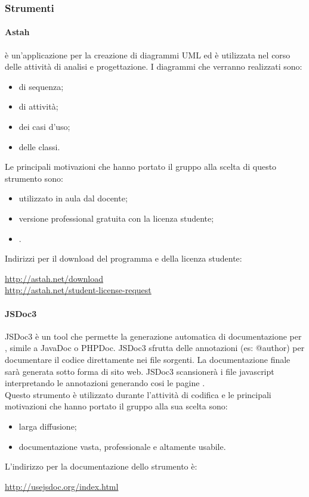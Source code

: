 				\subsubsection{Strumenti}
				\paragraph{Astah} \label{sec:astah}
				 è un'applicazione per la creazione di diagrammi UML ed è utilizzata nel corso delle attività di analisi e progettazione. I diagrammi che verranno realizzati sono:
				\begin{itemize}
					\item di sequenza;
					\item di attività;
					\item dei casi d'uso;
					\item delle classi.
				\end{itemize}
				Le principali motivazioni che hanno portato il gruppo alla scelta di questo strumento sono:
				\begin{itemize}
					\item utilizzato in aula dal docente;
					\item versione professional gratuita con la licenza studente;
					\item {}.
				\end{itemize}
				Indirizzi per il download del programma e della licenza studente:
				\begin{center}
					\url{http://astah.net/download} \\
					\url{http://astah.net/student-license-request}
				\end{center}
				
				\paragraph{JSDoc3} \label{sec:jsdoc}
				JSDoc3 è un tool che permette la generazione automatica di documentazione per , simile a JavaDoc o PHPDoc. JSDoc3 sfrutta delle annotazioni (es: @author) per documentare il codice direttamente nei file sorgenti. La documentazione finale sarà generata sotto forma di sito web. JSDoc3 scansionerà i file javascript interpretando le annotazioni generando cosi le pagine . \\
				Questo strumento è utilizzato durante l'attività di codifica e le principali motivazioni che hanno portato il gruppo alla sua scelta sono:
				\begin{itemize}
					\item larga diffusione;
					\item documentazione vasta, professionale e altamente usabile.
				\end{itemize}
				L'indirizzo per la documentazione dello strumento è:
				\begin{center}
					\url{http://usejsdoc.org/index.html}
				\end{center}
				
